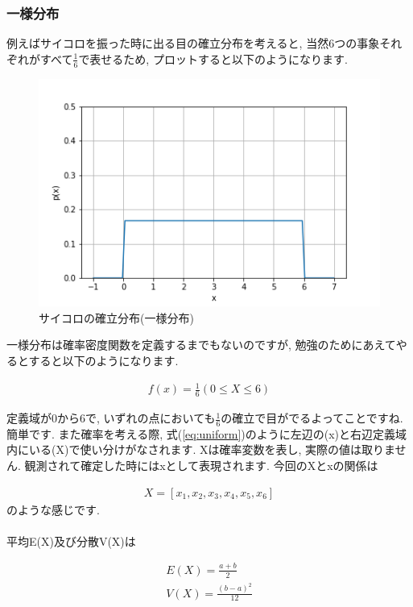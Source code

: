 \documentclass[11pt,a4paper]{jsarticle}                    %
\begin{document}
\subsubsection{一様分布}
例えばサイコロを振った時に出る目の確立分布を考えると, 当然6つの事象それぞれがすべて$\frac{1}{6}$で表せるため, プロットすると以下のようになります.\\
\begin{figure}[H]
\label{im:uniform}
  \centering
  \includegraphics[width=120mm,bb=0 0 432 288]{figures/uniform.png}
  \caption{サイコロの確立分布(一様分布)}
\end{figure}

一様分布は確率密度関数を定義するまでもないのですが, 勉強のためにあえてやるとすると以下のようになります.

\begin{eqnarray}
\label{eq:uniform}
f(x) = \frac{1}{6} (0 \leq X \leq 6)
\end{eqnarray}

定義域が0から6で, いずれの点においても$\frac{1}{6}$の確立で目がでるよってことですね. 簡単です. また確率を考える際, 式(\ref{eq:uniform})のように左辺の(x)と右辺定義域内にいる(X)で使い分けがなされます. Xは確率変数を表し, 実際の値は取りません. 観測されて確定した時にはxとして表現されます. 今回のXとxの関係は

\begin{eqnarray}
X = [x_1, x_2, x_3, x_4, x_5, x_6]
\end{eqnarray}
のような感じです. \\
\\
平均E(X)及び分散V(X)は

\begin{eqnarray}
E(X) = \frac{a+b}{2}\\
V(X) = \frac{(b-a)^2}{12}
\end{eqnarray}
\end{document}
